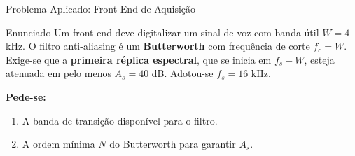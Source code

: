 \begin{frame}{Problema Aplicado: Front-End de Aquisição}
  \begin{block}{Enunciado}
    Um front-end deve digitalizar um sinal de voz com banda útil
    $W = 4$ kHz. O filtro anti-aliasing é um \textbf{Butterworth} com
    frequência de corte $f_c = W$. Exige-se que a \textbf{primeira réplica
    espectral}, que se inicia em $f_s - W$, esteja atenuada em pelo menos
    $A_s = 40$ dB. Adotou-se $f_s = 16$ kHz.
  \end{block}

  \vspace{0.2cm}
  \textbf{Pede-se:}
  \begin{enumerate}
    \item[(a)] A banda de transição disponível para o filtro.
    \item[(b)] A ordem mínima $N$ do Butterworth para garantir $A_s$.
  \end{enumerate}
\end{frame}


